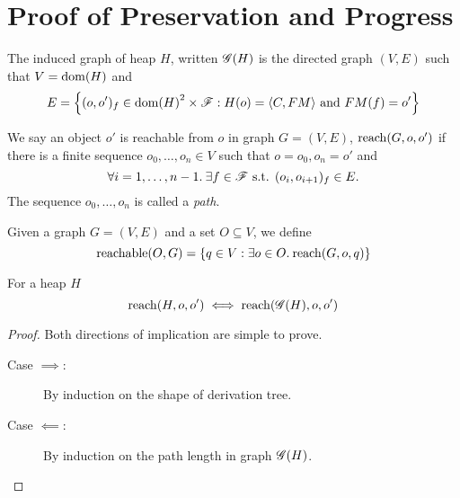 \chapter{Proof of Preservation and Progress}
\label{proof_of_pnp}

\begin{definition}
  The induced graph of heap $H$, written $\mathscr{G}{(H)}$ is the directed graph
  $(V, E)$ such that $V = \mbox{$\mathrm{dom}$}{(H)}$ and 
  \begin{equation}
    E = \left\{ (o, o')_f \in \mbox{$\mathrm{dom}$}{(H)}^2 \times \mathscr{F}: 
      H(o) = \mbox{$\langle C, FM \rangle$} \text{ and } FM(f) = o' \right\}
  \end{equation}
\end{definition}

\begin{definition}
  We say an object $o'$ is reachable from $o$ in graph $G = (V,
  E)$, $\mbox{$\mathrm{reach}$}{(G, o, o')}$ if there is a finite sequence $o_0, \dots,
  o_n \in V$ such that $o = o_0, o_n = o'$ and
  \begin{equation}
    \forall i = 1,\dots, n-1. \: \exists f \in \mathscr{F} \text{ s.t. } (o_i,
    o_{i+1})_f \in E.
  \end{equation}
  The sequence $o_0, \dots, o_n$ is called a \emph{path}.
\end{definition}

\begin{definition}
  Given a graph $G = (V, E)$ and a set $O \subseteq V$, we define
  \begin{equation}
    \mbox{$\mathrm{reachable}$}{(O, G)} = \left\{ q \in V: \exists o\in O.\: \mbox{$\mathrm{reach}$}{(G, o, q)}
    \right\} \notag
  \end{equation}
\end{definition}

\begin{proposition}
  \label{prop:reacheq}
  For a heap $H$ 
  \begin{equation}
    \mbox{$\mathrm{reach}$}{(H, o, o')} \iff \mbox{$\mathrm{reach}$}{(\ensuremath{\mathscr{G}}{(H)}, o, o')}
  \end{equation}
\end{proposition}

\begin{proof}
  Both directions of implication are simple to prove.
  \begin{description}
    \item[Case $\implies$:] By induction on the shape of derivation tree.
    \item[Case $\impliedby$:] By induction on the path length in graph
      $\mathscr{G}{(H)}$.
  \end{description}
\end{proof}

